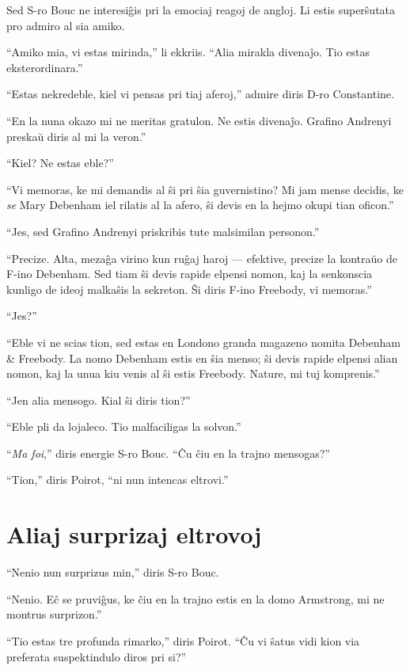 Sed S-ro Bouc ne interesiĝis pri la emociaj reagoj de angloj. Li estis superŝutata pro admiro al sia amiko.

``Amiko mia, vi estas mirinda,'' li ekkriis. ``Alia mirakla divenaĵo. Tio estas eksterordinara.''

``Estas nekredeble, kiel vi pensas pri tiaj aferoj,'' admire diris D-ro Constantine.

``En la nuna okazo mi ne meritas gratulon. Ne estis divenaĵo. Grafino Andrenyi preskaŭ diris al mi la veron.''

``Kiel? Ne estas eble?''

``Vi memoras, ke mi demandis al ŝi pri ŝia guvernistino? Mi jam mense decidis, ke \emph{se} Mary Debenham iel rilatis al la afero, ŝi devis en la hejmo okupi tian oficon.''

``Jes, sed Grafino Andrenyi priskribis tute malsimilan personon.''

``Precize. Alta, mezaĝa virino kun ruĝaj haroj --- efektive, precize la kontraŭo de F-ino Debenham. Sed tiam ŝi devis rapide elpensi nomon, kaj la senkonscia kunligo de ideoj malkaŝis la sekreton. Ŝi diris F-ino Freebody, vi memoras.''

``Jes?''

``Eble vi ne scias tion, sed estas en Londono granda magazeno nomita Debenham \& Freebody. La nomo Debenham estis en ŝia menso; ŝi devis rapide elpensi alian nomon, kaj la unua kiu venis al ŝi estis Freebody. Nature, mi tuj komprenis.''

``Jen alia mensogo. Kial ŝi diris tion?''

``Eble pli da lojaleco. Tio malfaciligas la solvon.''

``\emph{Ma foi},'' diris energie S-ro Bouc. ``Ĉu ĉiu en la trajno mensogas?''

``Tion,'' diris Poirot, ``ni nun intencas eltrovi.''

\chapter[Aliaj surprizaj eltrovoj]{Aliaj surprizaj eltrovoj}


``Nenio nun surprizus min,'' diris S-ro Bouc.

``Nenio. Eĉ se pruviĝus, ke ĉiu en la trajno estis en la domo Armstrong, mi ne montrus surprizon.''

``Tio estas tre profunda rimarko,'' diris Poirot. ``Ĉu vi ŝatus vidi kion via preferata suspektindulo diros pri si?''

